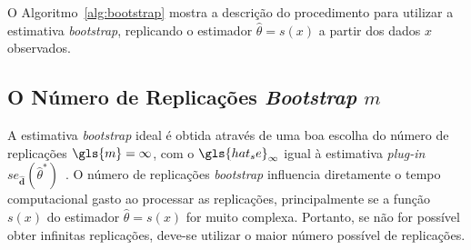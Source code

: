 \medskip
\begin{minipage}{0.80\textwidth}
\begin{algorithm2e}[H]
 \dontprintsemicolon %
 \linesnumbered%
 \SetLine
 \BlankLine
 \BlankLine
{}
\caption{Estimativa das replicações \textit{bootstrap}. \label{alg:bootstrap}}
\end{algorithm2e}
\end{minipage}

O Algoritmo~\ref{alg:bootstrap} \cite{EFRON:1993} mostra a descrição do procedimento para
utilizar a estimativa \textit{bootstrap}, replicando o estimador $\widehat{\theta} = s(x)$ a partir dos dados $x$ observados.

\subsection{O Número de Replicações \textit{Bootstrap} $m$}
\label{sec:numreplboot}
A estimativa \textit{bootstrap} ideal é obtida através de uma boa escolha do número de replicações
$\gls{m} = \infty$, com o $\gls{hat_se}_{\infty}$ igual à estimativa \textit{plug-in} $se_{\widehat{\textbf{d}}}(\widehat{\theta}^*)$~\cite{EFRON:1993}.
O número de replicações \textit{bootstrap} influencia diretamente o tempo computacional
gasto ao processar as replicações, principalmente se a função $s(x)$ do estimador $\widehat{\theta} = s(x)$ for muito
complexa. Portanto, se não for possível obter infinitas replicações, deve-se utilizar o maior número possível de replicações.


